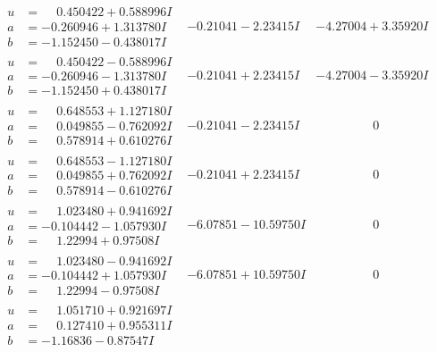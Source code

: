 \documentclass[1p]{elsarticle_modified}
\theoremstyle{definition}
\begin{document}
$$\begin{array}{c|c|c}
\begin{aligned}
u &= \phantom{-}0.450422 + 0.588996 I \\
a &= -0.260946 + 1.313780 I \\
b &= -1.152450 - 0.438017 I\end{aligned}
 & -0.21041 - 2.23415 I & -4.27004 + 3.35920 I \\ \hline\begin{aligned}
u &= \phantom{-}0.450422 - 0.588996 I \\
a &= -0.260946 - 1.313780 I \\
b &= -1.152450 + 0.438017 I\end{aligned}
 & -0.21041 + 2.23415 I & -4.27004 - 3.35920 I \\ \hline\begin{aligned}
u &= \phantom{-}0.648553 + 1.127180 I \\
a &= \phantom{-}0.049855 - 0.762092 I \\
b &= \phantom{-}0.578914 + 0.610276 I\end{aligned}
 & -0.21041 - 2.23415 I & \phantom{-0.000000 } 0 \\ \hline\begin{aligned}
u &= \phantom{-}0.648553 - 1.127180 I \\
a &= \phantom{-}0.049855 + 0.762092 I \\
b &= \phantom{-}0.578914 - 0.610276 I\end{aligned}
 & -0.21041 + 2.23415 I & \phantom{-0.000000 } 0 \\ \hline\begin{aligned}
u &= \phantom{-}1.023480 + 0.941692 I \\
a &= -0.104442 - 1.057930 I \\
b &= \phantom{-}1.22994 + 0.97508 I\end{aligned}
 & -6.07851 - 10.59750 I & \phantom{-0.000000 } 0 \\ \hline\begin{aligned}
u &= \phantom{-}1.023480 - 0.941692 I \\
a &= -0.104442 + 1.057930 I \\
b &= \phantom{-}1.22994 - 0.97508 I\end{aligned}
 & -6.07851 + 10.59750 I & \phantom{-0.000000 } 0 \\ \hline\begin{aligned}
u &= \phantom{-}1.051710 + 0.921697 I \\
a &= \phantom{-}0.127410 + 0.955311 I \\
b &= -1.16836 - 0.87547 I\end{aligned}

\end{array}$$
\end{document}
